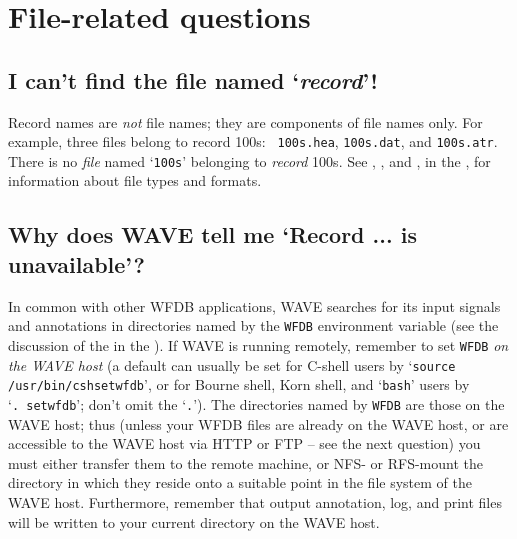 \documentclass[twoside]{book}
\newcommand{\WAVE}{{\sf WAVE}\xspace}
\begin{document}
\section{File-related questions}
\label{faq:file-related-questions}

\subsection{I can't find the file named `\emph{record}'!}

\label{faq:cannot-find-record}
Record names are \emph{not} file names; they are components of file
names only.  For example, three files belong to record 100s: {\tt
100s.hea}, {\tt 100s.dat}, and {\tt 100s.atr}. There is no \emph{file} named
`{\tt 100s}' belonging to \emph{record} 100s.  See
,
, and
, in the
,
for information about file types and formats.

\subsection{Why does \WAVE{} tell me `Record ... is unavailable'?}

In common with other WFDB applications, \WAVE{} searches for its input
signals and annotations in directories named by the {\tt WFDB}
environment variable (see the discussion of the 
 in the 
).
If \WAVE{} is running remotely,
remember to set {\tt WFDB} \emph{on the \WAVE{} host}
\index{WAVE host@\WAVE{} host}
(a default can
usually be set for C-shell users by `{\tt source
/usr/bin/cshsetwfdb}', or for Bourne shell, Korn shell, and `{\tt bash}'
users by `{\tt .~setwfdb}'; don't omit the `{\tt .}').  The directories
named by {\tt WFDB} are those on the \WAVE{} host; thus (unless your WFDB
files are already on the \WAVE{} host, or are accessible to the \WAVE{} host
via HTTP or FTP -- see the next question) you must either transfer them
to the remote machine, or NFS- or RFS-mount the directory in which they reside
onto a suitable point in the file system of the \WAVE{} host.  Furthermore,
remember that output annotation, log, and print files will be written
to your current directory on the \WAVE{} host.
\end{document}
